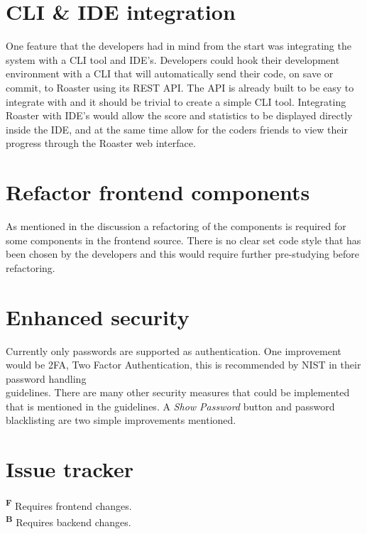 \documentclass[12pt,a4paper]{report}
\begin{document}
\section{CLI \& IDE integration}
One feature that the developers had in mind from the start was integrating the system with a CLI tool and IDE's. Developers could hook their development environment with a CLI that will automatically send their code, on save or commit, to Roaster using its REST API. The API is already built to be easy to integrate with and it should be trivial to create a simple CLI tool. Integrating Roaster with IDE's would allow the score and statistics to be displayed directly inside the IDE, and at the same time allow for the coders friends to view their progress through the Roaster web interface.

\section{Refactor frontend components}
As mentioned in the discussion a refactoring of the components is required for some components in the frontend source. There is no clear set code style that has been chosen by the developers and this would require further pre-studying before refactoring.


\section{Enhanced security}
Currently only passwords are supported as authentication. One improvement would be 2FA, Two Factor Authentication, this is recommended by NIST in their password handling \\ guidelines\cite{nist-passwords}. There are many other security measures that could be implemented that is mentioned in the guidelines. A \textit{Show Password} button and password blacklisting are two simple improvements mentioned\cite{oauth-nist}.

\newpage
\section{Issue tracker}
\label{sec:issue-tracker}
\textbf{\textsuperscript{F}} Requires frontend changes. \\
\textbf{\textsuperscript{B}} Requires backend changes.
\end{document}
